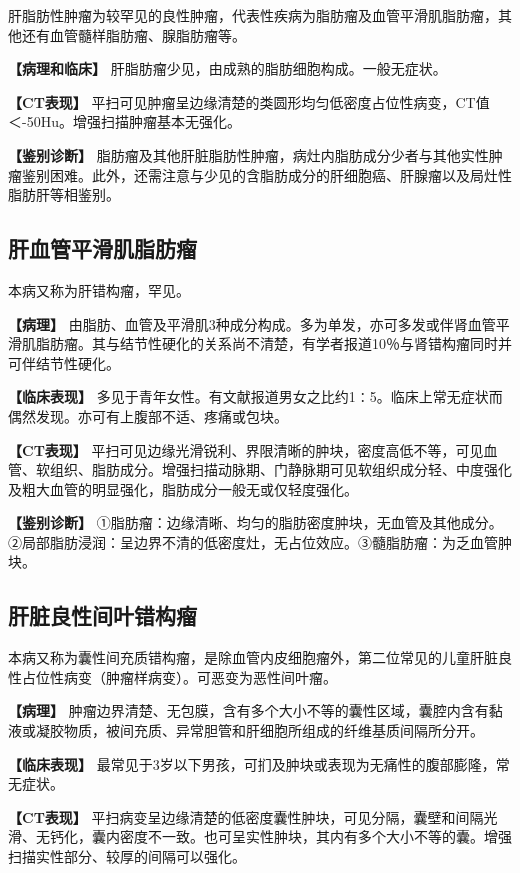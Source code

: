 肝脂肪性肿瘤为较罕见的良性肿瘤，代表性疾病为脂肪瘤及血管平滑肌脂肪瘤，其他还有血管髓样脂肪瘤、腺脂肪瘤等。

\textbf{【病理和临床】} 肝脂肪瘤少见，由成熟的脂肪细胞构成。一般无症状。

\textbf{【CT表现】}
平扫可见肿瘤呈边缘清楚的类圆形均匀低密度占位性病变，CT值＜-50Hu。增强扫描肿瘤基本无强化。

\textbf{【鉴别诊断】}
脂肪瘤及其他肝脏脂肪性肿瘤，病灶内脂肪成分少者与其他实性肿瘤鉴别困难。此外，还需注意与少见的含脂肪成分的肝细胞癌、肝腺瘤以及局灶性脂肪肝等相鉴别。

\subsection{肝血管平滑肌脂肪瘤}

本病又称为肝错构瘤，罕见。

\textbf{【病理】}
由脂肪、血管及平滑肌3种成分构成。多为单发，亦可多发或伴肾血管平滑肌脂肪瘤。其与结节性硬化的关系尚不清楚，有学者报道10％与肾错构瘤同时并可伴结节性硬化。

\textbf{【临床表现】}
多见于青年女性。有文献报道男女之比约1∶5。临床上常无症状而偶然发现。亦可有上腹部不适、疼痛或包块。

\textbf{【CT表现】}
平扫可见边缘光滑锐利、界限清晰的肿块，密度高低不等，可见血管、软组织、脂肪成分。增强扫描动脉期、门静脉期可见软组织成分轻、中度强化及粗大血管的明显强化，脂肪成分一般无或仅轻度强化。

\textbf{【鉴别诊断】}
①脂肪瘤：边缘清晰、均匀的脂肪密度肿块，无血管及其他成分。②局部脂肪浸润：呈边界不清的低密度灶，无占位效应。③髓脂肪瘤：为乏血管肿块。

\subsection{肝脏良性间叶错构瘤}

本病又称为囊性间充质错构瘤，是除血管内皮细胞瘤外，第二位常见的儿童肝脏良性占位性病变（肿瘤样病变）。可恶变为恶性间叶瘤。

\textbf{【病理】}
肿瘤边界清楚、无包膜，含有多个大小不等的囊性区域，囊腔内含有黏液或凝胶物质，被间充质、异常胆管和肝细胞所组成的纤维基质间隔所分开。

\textbf{【临床表现】}
最常见于3岁以下男孩，可扪及肿块或表现为无痛性的腹部膨隆，常无症状。

\textbf{【CT表现】}
平扫病变呈边缘清楚的低密度囊性肿块，可见分隔，囊壁和间隔光滑、无钙化，囊内密度不一致。也可呈实性肿块，其内有多个大小不等的囊。增强扫描实性部分、较厚的间隔可以强化。

